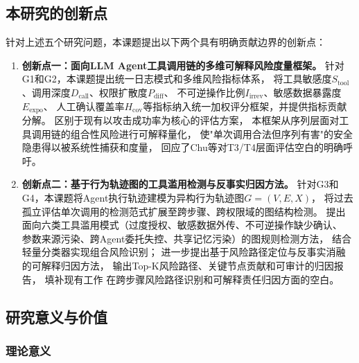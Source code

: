 \subsection{本研究的创新点}

针对上述五个研究问题，本课题提出以下两个具有明确贡献边界的创新点：

\begin{enumerate}
  \item \textbf{创新点一：面向LLM Agent工具调用链的多维可解释风险度量框架。}
  针对G1和G2，本课题提出统一日志模式和多维风险指标体系，
  将工具敏感度$S_{\text{tool}}$、调用深度$D_{\text{call}}$、权限扩散度$P_{\text{diff}}$、
  不可逆操作比例$I_{\text{irrev}}$、敏感数据暴露度$E_{\text{expo}}$、
  人工确认覆盖率$H_{\text{cov}}$等指标纳入统一加权评分框架，并提供指标贡献分解。
  区别于现有以攻击成功率为核心的评估方案\cite{balunovic2024agentdojo,zhang2024injectagent,liu2024formalizing}，
  本框架从序列层面对工具调用链的组合性风险进行可解释量化，
  使"单次调用合法但序列有害"的安全隐患得以被系统性捕获和度量，
  回应了Chu等\cite{chu2026systematic}对T3/T4层面评估空白的明确呼吁。

  \item \textbf{创新点二：基于行为轨迹图的工具滥用检测与反事实归因方法。}
  针对G3和G4，本课题将Agent执行轨迹建模为异构行为轨迹图$G=(V,E,X)$，
  将过去孤立评估单次调用的检测范式扩展至跨步骤、跨权限域的图结构检测。
  提出面向六类工具滥用模式（过度授权、敏感数据外传、不可逆操作缺少确认、
  参数来源污染、跨Agent委托失控、共享记忆污染）的图规则检测方法，
  结合轻量分类器实现组合风险识别；
  进一步提出基于风险路径定位与反事实消融的可解释归因方法，
  输出Top-K风险路径、关键节点贡献和可审计的归因报告，
  填补现有工作\cite{dewitt2026openchallenges,he2025sentinelagent,wang2026aligning}
  在跨步骤风险路径识别和可解释责任归因方面的空白。
\end{enumerate}

\subsection{研究意义与价值}

\subsubsection{理论意义}

